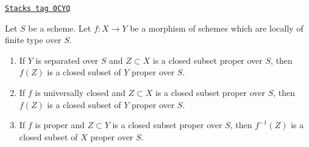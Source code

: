\begin{lemma}
\label{coherent-lemma-functoriality-closed-proper-over-base}
\href{https://stacks.math.columbia.edu/tag/0CYQ}{\texttt{Stacks tag 0CYQ}}

Let $S$ be a scheme. Let $f : X \to Y$ be a morphism of schemes which
are locally of finite type over $S$.
\begin{enumerate}
\item If $Y$ is separated over $S$ and $Z \subset X$ is a closed subset
proper over $S$, then $f(Z)$ is a closed subset of $Y$ proper over $S$.
\item If $f$ is universally closed and $Z \subset X$ is a
closed subset proper over $S$, then $f(Z)$ is a closed subset
of $Y$ proper over $S$.
\item If $f$ is proper and $Z \subset Y$ is a closed subset
proper over $S$, then $f^{-1}(Z)$ is a closed subset of $X$ proper over $S$.
\end{enumerate}
\end{lemma}

